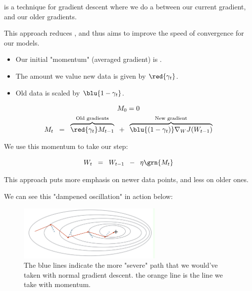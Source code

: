             \begin{definition}
                 is a technique for gradient descent where we do a  between our current gradient, and our older gradients.

                This approach reduces , and thus aims to improve the speed of convergence for our models.

                \begin{itemize}
                    \item Our initial "momentum" (averaged gradient) is .
                    \item The amount we value new data is given by $\red{\gamma_t}$.
                    \item Old data is scaled by $\blu{1-\gamma_t}$.
                \end{itemize}

                \begin{equation*}
                    \begin{gathered}
                        M_0=0 \\
                        M_t 
                        \;\;=\;\;
                        \overbrace{
                            \red{\gamma_t} M_{t-1}
                        }^{\text{Old gradients}}
                        \;\;+\;\; 
                        \overbrace{
                            \blu{(1-\gamma_t)} \nabla_W J (W_{t-1})
                        }^{\text{New gradient}}
                    \end{gathered}
                \end{equation*}

                We use this momentum to take our step:

                \begin{equation*}
                    W_t \;\;=\;\; W_{t-1} \;\;-\;\; \eta \grn{M_t}
                \end{equation*}
                
                \subsecdiv

                This approach puts more emphasis on newer data points, and less on older ones.
            \end{definition}

            \miniex We can see this "dampened oscillation" in action below:

            \begin{figure}[H]
                \centering
                    \includegraphics[width=70mm,scale=0.5]{images/nn_2_images/momentum.png}
                
                \caption*{The blue lines indicate the more "severe" path that we would've taken with normal gradient descent. the orange line is the line we take with momentum. }
            \end{figure}

